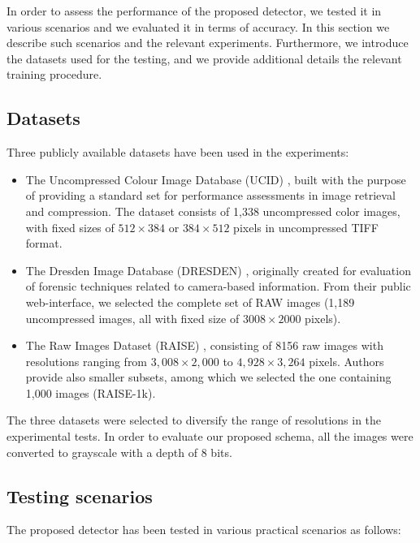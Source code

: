 \documentclass[review]{elsarticle}
\begin{document}
In order to assess the performance of the proposed detector, we tested it in various scenarios and we evaluated it in terms of accuracy. In this section we describe such scenarios and the relevant experiments. Furthermore, we introduce the datasets used for the testing, and we provide additional details the relevant training procedure.

\subsection{Datasets}
\label{subsec:datasets}

Three publicly available datasets have been used in the experiments:
\begin{itemize}
	\item The Uncompressed Colour Image Database (UCID) \cite{schaefer2003ucid}, built with the purpose of providing a standard set for performance assessments in image retrieval and compression. The dataset consists of 1,338 uncompressed color images, with fixed sizes of $512\times384$ or $384\times512$ pixels in uncompressed TIFF format.
	\item The Dresden Image Database (DRESDEN) \cite{gloe2010dresden}, originally created for evaluation of forensic techniques related to camera-based information. From their public web-interface, we selected the complete set of RAW images (1,189 uncompressed images, all with fixed size of $3008\times2000$ pixels).
	\item The Raw Images Dataset (RAISE) \cite{dang2015raise}, consisting of 8156 raw images with resolutions ranging from $3,008\times2,000$ to $4,928\times3,264$ pixels. Authors provide also smaller subsets, among which we selected the one containing 1,000 images (RAISE-1k).
\end{itemize}

The three datasets were selected to diversify the range of resolutions in the experimental tests. In order to evaluate our proposed schema, all the images were converted to grayscale with a depth of 8 bits.

\subsection{Testing scenarios}
\label{subsec:test_scenarios}
The proposed detector has been tested in various practical scenarios as follows:%
\end{document}
